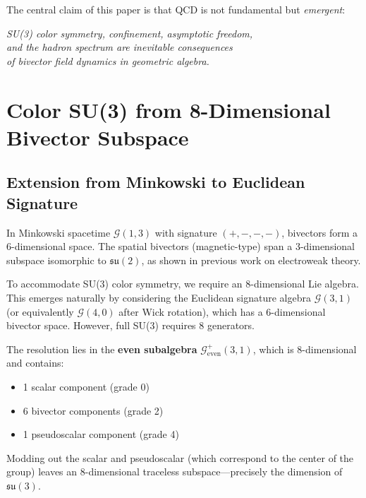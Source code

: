 \documentclass[11pt,a4paper]{article}
\newcommand{\Cl}{\mathcal{G}}
\theoremstyle{definition}
\theoremstyle{plain}
\theoremstyle{remark}
\begin{document}
The central claim of this paper is that QCD is not fundamental but \emph{emergent}:

\begin{center}
\textit{SU(3) color symmetry, confinement, asymptotic freedom, \\
and the hadron spectrum are inevitable consequences \\
of bivector field dynamics in geometric algebra.}
\end{center}

\vspace{1em}

\section{Color SU(3) from 8-Dimensional Bivector Subspace}
\label{sec:color-su3}

\subsection{Extension from Minkowski to Euclidean Signature}

In Minkowski spacetime $\Cl(1,3)$ with signature $(+,-,-,-)$, bivectors form a 6-dimensional space. The spatial bivectors (magnetic-type) span a 3-dimensional subspace isomorphic to $\mathfrak{su}(2)$, as shown in previous work on electroweak theory.

To accommodate SU(3) color symmetry, we require an 8-dimensional Lie algebra. This emerges naturally by considering the Euclidean signature algebra $\Cl(3,1)$ (or equivalently $\Cl(4,0)$ after Wick rotation), which has a 6-dimensional bivector space. However, full SU(3) requires 8 generators.

The resolution lies in the \textbf{even subalgebra} $\Cl^+_{\mathrm{even}}(3,1)$, which is 8-dimensional and contains:
\begin{itemize}[leftmargin=*,itemsep=3pt]
  \item 1 scalar component (grade 0)
  \item 6 bivector components (grade 2)
  \item 1 pseudoscalar component (grade 4)
\end{itemize}

Modding out the scalar and pseudoscalar (which correspond to the center of the group) leaves an 8-dimensional traceless subspace---precisely the dimension of $\mathfrak{su}(3)$.
\end{document}

